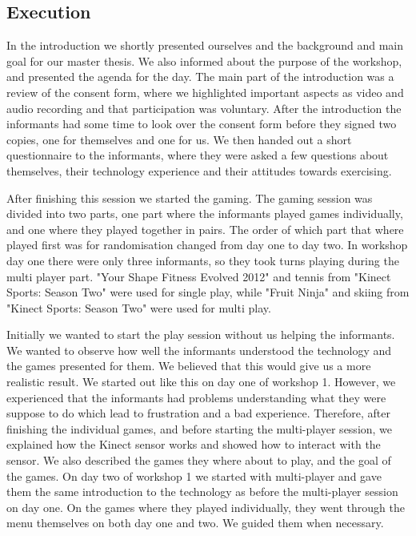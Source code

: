 \subsection{Execution}
In the introduction we shortly presented ourselves and the background and main goal for our master thesis. We also informed about the purpose of the workshop, and presented the agenda for the day. The main part of the introduction was a review of the consent form, where we highlighted important aspects as video and audio recording and that participation was voluntary. After the introduction the informants had some time to look over the consent form before they signed two copies, one for themselves and one for us. We then handed out a short questionnaire to the informants, where they were asked a few questions about themselves, their technology experience and their attitudes towards exercising. 

After finishing this session we started the gaming. The gaming session was divided into two parts, one part where the informants played games individually, and one where they played together in pairs. The order of which part that where played first was for randomisation changed from day one to day two. In workshop day one there were only three informants, so they took turns playing during the multi player part. "Your Shape Fitness Evolved 2012" and tennis from "Kinect Sports: Season Two" were used for single play, while "Fruit Ninja" and skiing from "Kinect Sports: Season Two" were used for multi play. 

Initially we wanted to start the play session without us helping the informants. We wanted to observe how well the informants understood the technology and the games presented for them. We believed that this would give us a more realistic result. We started out like this on day one of workshop 1. However, we experienced that the informants had problems understanding what they were suppose to do which lead to frustration and a bad experience. Therefore, after finishing the individual games, and before starting the multi-player session, we explained how the Kinect sensor works and showed how to interact with the sensor. We also described the games they where about to play, and the goal of the games. On day two of workshop 1 we started with multi-player and gave them the same introduction to the technology as before the multi-player session on day one. On the games where they played individually, they went through the menu themselves on both day one and two. We guided them when necessary. 


